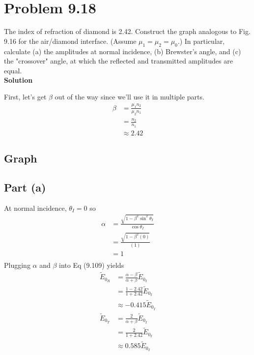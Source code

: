 \documentclass[12pt]{article}
\newcommand{\enterProblemHeader}[1]{
	\rhead{#1}
}
\newenvironment{homeworkProblem}[1]{
    \section{Problem #1}
    \enterProblemHeader{#1}
}{
	\pagebreak
}
\newcommand{\solution}{\textbf{\large Solution}}
\begin{document}
\begin{homeworkProblem}{9.18}
	The index of refraction of diamond is 2.42. Construct the graph analogous
	to Fig. 9.16 for the air/diamond interface. (Assume $\mu_1=\mu_2=\mu_0$.) In
	particular, calculate (a) the amplitudes at normal incidence, (b) Brewster's
	angle, and (c) the "crossover" angle, at which the reflected and transmitted
	amplitudes are equal.\\

	\solution

	First, let's get $\beta$ out of the way since we'll use it in multiple
	parts.
	\begin{align*}
		\beta &= \frac {\mu_1 n_2} {\mu_2 n_1}\\
		&= \frac {n_2} {n_1}\\
		&\approx 2.42
	\end{align*}

	\subsection{Graph}

	\begin{center}
	\end{center}

	\subsection{Part (a)}

	At normal incidence, $\theta_I = 0$ so
	\begin{align*}
		\alpha &= \frac { \sqrt{ 1 - \beta^2 \sin^2 \theta_I } } { \cos \theta_I
		}\tag{9.110}\\
		&= \frac { \sqrt {1 - \beta^2 (0) } } { (1) }\\
		&= 1\\
	\end{align*}
	Plugging $\alpha$ and $\beta$ into Eq (9.109) yields
	\begin{align*}
		\tilde E_{0_R} &= \frac {\alpha - \beta} {\alpha + \beta} \tilde E_{0_I}
		\tag{9.109}\\
		&= \frac {1 - 2.42} {1 + 2.42} \tilde E_{0_I}\\
		&\approx -0.415 \tilde E_{0_I}\\
		\tilde E_{0_T} &= \frac 2 {\alpha + \beta} \tilde E_{0_I}\tag{9.109}\\
		&= \frac 2 {1 + 2.42} \tilde E_{0_I}\\
		&\approx 0.585 \tilde E_{0_I}
	\end{align*}


\end{homeworkProblem}
\end{document}
